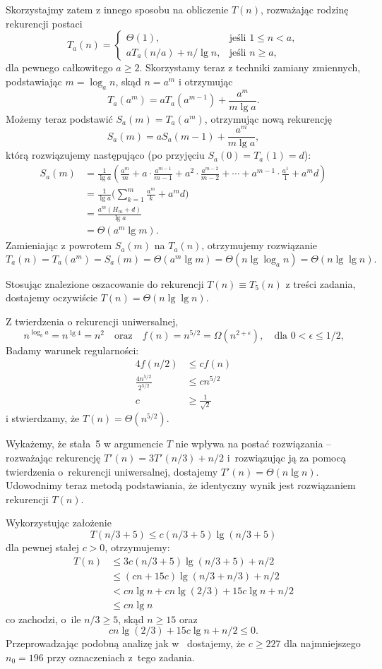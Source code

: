 Skorzystajmy zatem z innego sposobu na obliczenie $T(n)$, rozważając rodzinę rekurencji postaci
\[
	T_a(n) = \begin{cases}
		\Theta(1), & \text{jeśli $1\le n<a$}, \\
		aT_a(n/a)+n/\!\lg n, & \text{jeśli $n\ge a$},
	\end{cases}
\]
dla pewnego całkowitego $a\ge2$. Skorzystamy teraz z techniki zamiany zmiennych, podstawiając $m=\log_an$, skąd $n=a^m$ i otrzymując
\[
    T_a(a^m) = aT_a(a^{m-1})+\frac{a^m}{m\lg a}.
\]
Możemy teraz podstawić $S_a(m)=T_a(a^m)$, otrzymując nową rekurencję
\[
    S_a(m) = aS_a(m-1)+\frac{a^m}{m\lg a},
\]
którą rozwiązujemy następująco (po przyjęciu $S_a(0)=T_a(1)=d$):
\begin{align*}
    S_a(m) &= \frac{1}{\lg a}\left(\frac{a^m}{m}+a\cdot\frac{a^{m-1}}{m-1}+a^2\cdot\frac{a^{m-2}}{m-2}+\cdots+a^{m-1}\cdot\frac{a^1}{1}+a^md\right) \\[1mm]
	&= \frac{1}{\lg a}\biggl(\sum_{k=1}^m\frac{a^m}{k}+a^md\biggr) \\[1mm]
	&= \frac{a^m(H_m+d)}{\lg a} \\[1mm]
	&= \Theta(a^m\lg m).
\end{align*}
Zamieniając z powrotem $S_a(m)$ na $T_a(n)$, otrzymujemy rozwiązanie
\[
    T_a(n) = T_a(a^m) = S_a(m) = \Theta(a^m\lg m) = \Theta(n\lg\log_a n) = \Theta(n\lg\lg n).
\]

Stosując znalezione oszacowanie do rekurencji $T(n)\equiv T_5(n)$ z treści zadania, dostajemy oczywiście $T(n)=\Theta(n\lg\lg n)$.

\subproblem %
Z twierdzenia o rekurencji uniwersalnej,
\[
	n^{\log_ba} = n^{\lg4} = n^2 \quad\text{oraz}\quad f(n) = n^{5/2} = \Omega(n^{2+\epsilon}), \quad\text{dla $0<\epsilon\le1/2$,}
\]
Badamy warunek regularności:
\begin{align*}
	4f(n/2) &\le cf(n) \\
	\frac{4n^{5/2}}{2^{5/2}} &\le cn^{5/2} \\
	c &\ge \frac{1}{\sqrt{2}}
\end{align*}
i stwierdzamy, że $T(n)=\Theta(n^{5/2})$.

\subproblem %
Wykażemy, że stała~5 w argumencie $T$ nie wpływa na postać rozwiązania -- rozważając rekurencję $T'(n)=3T'(n/3)+n/2$ i~rozwiązując ją za pomocą twierdzenia o~rekurencji uniwersalnej, dostajemy $T'(n)=\Theta(n\lg n)$. Udowodnimy teraz metodą podstawiania, że identyczny wynik jest rozwiązaniem rekurencji $T(n)$.

Wykorzystując założenie
\[
	T(n/3+5) \le c(n/3+5)\lg(n/3+5)
\]
dla pewnej stałej $c>0$, otrzymujemy:
\begin{align*}
	T(n) &\le 3c(n/3+5)\lg(n/3+5)+n/2 \\
	&\le (cn+15c)\lg(n/3+n/3)+n/2 \\
	&< cn\lg n+cn\lg(2/3)+15c\lg n+n/2 \\
	&\le cn\lg n
\end{align*}
co zachodzi, o~ile $n/3\ge5$, skąd $n\ge15$ oraz
\[
    cn\lg(2/3)+15c\lg n+n/2 \le 0.
\]
Przeprowadzając podobną analizę jak w~ dostajemy, że $c\ge227$ dla najmniejszego $n_0=196$ przy oznaczeniach z~tego zadania.

